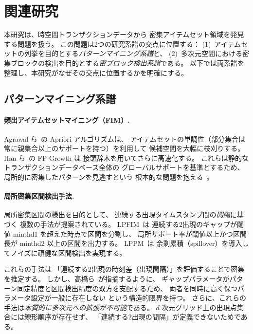 \section{関連研究}\label{sec:related}

本研究は、時空間トランザクションデータから
密集アイテムセット領域を発見する問題を扱う。
この問題は2つの研究系譜の交点に位置する：
(1)~アイテムセットの列挙を目的とする\emph{パターンマイニング系譜}と、
(2)~多次元空間における密集ブロックの検出を目的とする\emph{密ブロック検出系譜}である。
以下では両系譜を整理し、本研究がなぜその交点に位置するかを明確にする。

\subsection{パターンマイニング系譜}

\paragraph{頻出アイテムセットマイニング（FIM）.}
Agrawal ら~\cite{agrawal1994apriori}の Apriori アルゴリズムは、
アイテムセットの単調性（部分集合は常に親集合以上のサポートを持つ）を利用して
候補空間を大幅に枝刈りする。
Han ら~\cite{han2000mining}の FP-Growth は
接頭辞木を用いてさらに高速化する。
これらは静的なトランザクションデータベース全体の
グローバルサポートを基準とするため、
局所的に密集したパターンを見逃すという
根本的な問題を抱える~\cite{aprioriwindow}。

\paragraph{局所密集区間検出手法.}
局所密集区間の検出を目的として、
連続する出現タイムスタンプ間の\emph{間隔}に基づく
複数の手法が提案されている。
LPFIM~\cite{mahanta2005lpfim}は
連続する2出現のギャップが閾値 minthd1 を超えた時点で区間を分割し、
局所サポート率が閾値以上かつ区間長が minthd2 以上の区間を出力する。
LPPM~\cite{fournierviger2021lppm}は
余剰累積（spillover）を導入してノイズに頑健な区間検出を実現する。

これらの手法は
「連続する2出現の時刻差（出現間隔）」を評価することで密集を推定する。
しかし、高橋ら~\cite{aprioriwindow}が指摘するように、
ギャップパラメータがパターン同定精度と区間検出精度の双方を支配するため、
両者を同時に高く保つパラメータ設定が一般に存在しない
という構造的限界を持つ。
さらに、これらの手法は\emph{本質的に多次元への拡張が不可能}である。
$d$ 次元グリッド上の出現点集合には線形順序が存在せず、
「連続する2出現の間隔」が定義できないためである。

